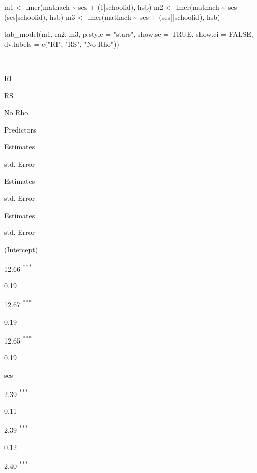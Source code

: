 \documentclass[
  letterpaper,
  DIV=11,
  numbers=noendperiod]{scrreprt}
\newenvironment{Shaded}{\begin{snugshade}}{\end{snugshade}}
\newcommand{\AttributeTok}[1]{\textcolor[rgb]{0.49,0.56,0.16}{#1}}
\newcommand{\ConstantTok}[1]{\textcolor[rgb]{0.53,0.00,0.00}{#1}}
\newcommand{\DecValTok}[1]{\textcolor[rgb]{0.25,0.63,0.44}{#1}}
\newcommand{\FunctionTok}[1]{\textcolor[rgb]{0.02,0.16,0.49}{#1}}
\newcommand{\NormalTok}[1]{\textcolor[rgb]{0.00,0.44,0.13}{#1}}
\newcommand{\OtherTok}[1]{\textcolor[rgb]{0.00,0.44,0.13}{#1}}
\newcommand{\SpecialCharTok}[1]{\textcolor[rgb]{0.25,0.44,0.63}{#1}}
\newcommand{\StringTok}[1]{\textcolor[rgb]{0.25,0.44,0.63}{#1}}
\begin{document}
\begin{Shaded}
\begin{Highlighting}[]
\NormalTok{m1 }\OtherTok{\textless{}{-}} \FunctionTok{lmer}\NormalTok{(mathach }\SpecialCharTok{\textasciitilde{}}\NormalTok{ ses }\SpecialCharTok{+}\NormalTok{ (}\DecValTok{1}\SpecialCharTok{|}\NormalTok{schoolid), hsb)}
\NormalTok{m2 }\OtherTok{\textless{}{-}} \FunctionTok{lmer}\NormalTok{(mathach }\SpecialCharTok{\textasciitilde{}}\NormalTok{ ses }\SpecialCharTok{+}\NormalTok{ (ses}\SpecialCharTok{|}\NormalTok{schoolid), hsb)}
\NormalTok{m3 }\OtherTok{\textless{}{-}} \FunctionTok{lmer}\NormalTok{(mathach }\SpecialCharTok{\textasciitilde{}}\NormalTok{ ses }\SpecialCharTok{+}\NormalTok{ (ses}\SpecialCharTok{||}\NormalTok{schoolid), hsb)}

\FunctionTok{tab\_model}\NormalTok{(m1, m2, m3,}
          \AttributeTok{p.style =} \StringTok{"stars"}\NormalTok{,}
          \AttributeTok{show.se =} \ConstantTok{TRUE}\NormalTok{,}
          \AttributeTok{show.ci =} \ConstantTok{FALSE}\NormalTok{,}
          \AttributeTok{dv.labels =} \FunctionTok{c}\NormalTok{(}\StringTok{"RI"}\NormalTok{, }\StringTok{"RS"}\NormalTok{, }\StringTok{"No Rho"}\NormalTok{))}
\end{Highlighting}
\end{Shaded}

~

RI

RS

No Rho

Predictors

Estimates

std. Error

Estimates

std. Error

Estimates

std. Error

(Intercept)

12.66 \textsuperscript{***}

0.19

12.67 \textsuperscript{***}

0.19

12.65 \textsuperscript{***}

0.19

ses

2.39 \textsuperscript{***}

0.11

2.39 \textsuperscript{***}

0.12

2.40 \textsuperscript{***}
\end{document}
